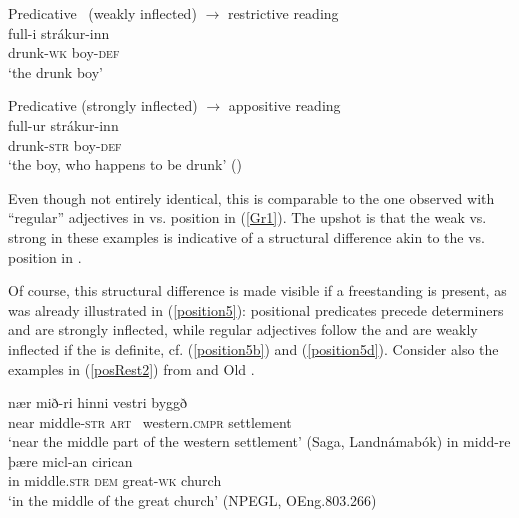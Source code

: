 \documentclass[output=paper,colorlinks,citecolor=brown]{langscibook}
\begin{document}
\begin{exe}
   \ex \label{AppoRest}
     \begin{xlist}
         \ex  Predicative  \ (weakly inflected) \hfill $\rightarrow$ restrictive reading  \\ 
        \gll  full-i  strákur-inn   \\  
         drunk-\textsc{wk}  boy-\textsc{def}     \\
         \glt `the drunk boy' 
    
     \ex   Predicative  (strongly inflected) \hfill $\rightarrow$ appositive reading   \\ 
      \gll  full-ur strákur-inn   \\ 
       drunk-\textsc{str}  boy-\textsc{def}     \\
       \glt `the boy, who happens to be drunk' (\citealt[300]{Pfaff2017})
     \end{xlist}
\end{exe} 

Even though not entirely identical, this  is comparable to the one observed with ``regular'' adjectives in  vs.  position in (\ref{Gr1}). The upshot is that the weak vs. strong  in these examples is indicative of a structural difference akin to the  vs.  position in . 

Of course, this structural difference is made visible if a freestanding  is present, as was already illustrated in (\ref{position5}): positional predicates precede determiners and are strongly inflected, while regular adjectives follow the  and are weakly inflected if the  is definite, cf. (\ref{position5b}) and (\ref{position5d}). Consider also the examples in (\ref{posRest2}) from  and Old .

\begin{exe}
   \ex \label{posRest2}
     \begin{xlist}
         \ex \label{posRest2a} \gll  nær mið-ri hinni vestri byggð  \\ 
          near middle-\textsc{str} \textsc{art} \ western.\textsc{cmpr} settlement  \\
          \glt `near the middle part of the western settlement' (Saga, Landnámabók)
        \ex \label{posRest2b} \gll in midd-re þære micl-an cirican \\ 
         in middle.\textsc{str} \textsc{dem} great-\textsc{wk} church     \\
       \glt  `in the middle of the great church' (NPEGL, OEng.803.266)        
     \end{xlist}
\end{exe} 
\end{document}
